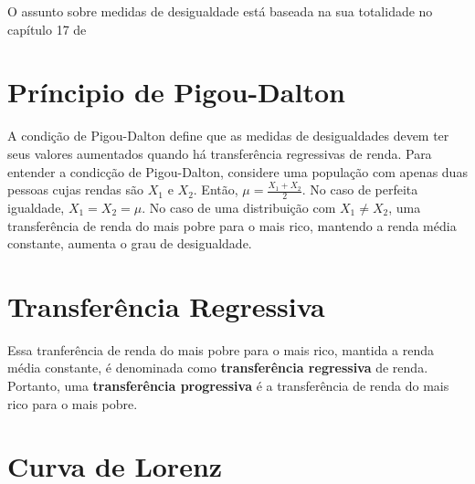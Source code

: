 \documentclass[
]{book}
\begin{document}
O assunto sobre medidas de desigualdade está baseada na sua totalidade no capítulo 17 de \citet{Hoffmann2006}

\hypertarget{pruxedncipio-de-pigou-dalton}{%
\section{Príncipio de Pigou-Dalton}\label{pruxedncipio-de-pigou-dalton}}

A condição de Pigou-Dalton define que as medidas de desigualdades devem ter seus valores aumentados quando há transferência regressivas de renda.
Para entender a condicção de Pigou-Dalton, considere uma população com apenas duas pessoas cujas rendas são \(X_1\) e \(X_2\). Então, \(\mu = \frac{X_1 + X_2}{2}\). No caso de perfeita igualdade, \(X_1 = X_2 = \mu\). No caso de uma distribuição com \(X_1 \neq X_2\), uma transferência de renda do mais pobre para o mais rico, mantendo a renda média constante, aumenta o grau de desigualdade.

\hypertarget{transferuxeancia-regressiva}{%
\section{Transferência Regressiva}\label{transferuxeancia-regressiva}}

Essa tranferência de renda do mais pobre para o mais rico, mantida a renda média constante, é denominada como \textbf{transferência regressiva} de renda. Portanto, uma \textbf{transferência progressiva} é a transferência de renda do mais rico para o mais pobre.

\hypertarget{curva-de-lorenz}{%
\section{Curva de Lorenz}\label{curva-de-lorenz}}
\end{document}
